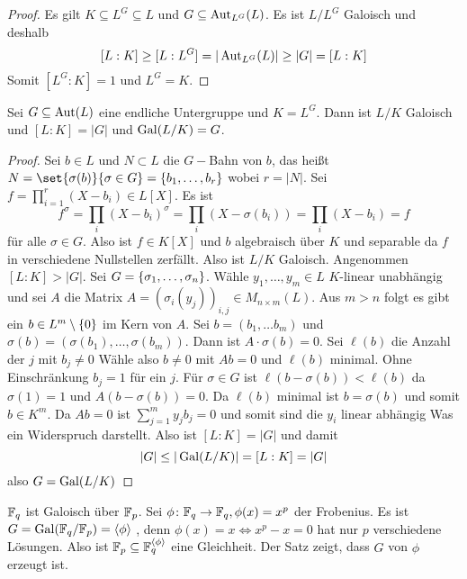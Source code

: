 \begin{proof}
    Es gilt \(K\subseteq L^G\subseteq L\) und \(G\subseteq\operatorname{Aut}_{L^G}(L)\). Es ist \(L/L^G\) Galoisch und deshalb
    \[[L:K]\geq [L:L^G]=|\operatorname{Aut}_{L^G}(L)|\geq |G|=[L:K]\]
    Somit \([L^G:K]=1\) und \(L^G=K\).
\end{proof}
\begin{Satz}\label{Satz:Galois2}
    Sei \(G\subseteq \operatorname{Aut}(L)\) eine endliche Untergruppe und \(K=L^G\). Dann ist \(L/K\) Galoisch und \([L:K]=|G|\) und \(\operatorname{Gal}(L/K)=G\).
\end{Satz}
\begin{proof}
    Sei \(b\in L\) und \(N\subset L\) die \(G-\)Bahn von \(b\), das heißt \(N=\set{\sigma(b)}{ \sigma\in G}=\{b_1,\dots,b_r\}\) wobei \(r=|N|\). Sei \(f=\prod_{i=1}^r(X-b_i)\in L[X]\).
    Es ist \[f^\sigma=\prod_i(X-b_i)^\sigma=\prod_i(X-\sigma(b_i))=\prod_i(X-b_i)=f\] für alle \(\sigma\in G.\) Also ist \(f\in K[X]\) und \(b\) algebraisch über \(K\) und separable da \(f\) in verschiedene Nullstellen zerfällt.
    Also ist \(L/K\) Galoisch.
    Angenommen \([L:K]>|G|\). Sei \(G=\{\sigma_1,\dots,\sigma_n\}\). Wähle \(y_1,\dots,y_m\in L\) \(K\)-linear unabhängig und sei \(A\) die Matrix \(A=(\sigma_i(y_j))_{i,j}\in M_{n\times m}(L)\).
    Aus \(m>n\) folgt es gibt ein \(b\in L^m\setminus\{0\}\) im Kern von \(A\).
    Sei \(b=(b_1,\dots b_m)\) und \(\sigma(b)=(\sigma(b_1),\dots,\sigma(b_m))\).
    Dann ist \(A\cdot \sigma(b)=0\).
    Sei \(\ell(b)\) die Anzahl der \(j\) mit \(b_j\neq 0\) Wähle also \(b\neq 0\) mit \(Ab=0\) und \(\ell(b)\) minimal. Ohne Einschränkung \(b_j=1\) für ein \(j\).
    Für \(\sigma\in G\) ist \(\ell(b-\sigma(b))<\ell(b)\) da \(\sigma(1)=1\) und \(A(b-\sigma(b))=0\). Da \(\ell(b)\) minimal ist \(b=\sigma(b)\) und somit \(b\in K^m\).
    Da \(Ab=0\) ist \(\sum_{j=1}^my_jb_j=0\) und somit sind die \(y_i\) linear abhängig Was ein Widerspruch darstellt.
    Also ist \([L:K]=|G|\) und damit 
    \[|G|\leq |\operatorname{Gal}(L/K)|=[L:K]=|G|\] also \(G=\operatorname{Gal}(L/K)\)
\end{proof}
\begin{Bsp}
    \(\mathbb{F}_q\) ist Galoisch über \(\mathbb{F}_p\). Sei \(\phi\colon \mathbb{F}_q\to \mathbb{F}_q, \phi(x)=x^p\) der Frobenius. Es ist \(G=\operatorname{Gal}(\mathbb{F}_q/\mathbb{F}_p)=\langle\phi\rangle\)
, denn \(\phi(x)=x\iff x^p-x=0\) hat nur \(p\) verschiedene Lösungen. Also ist \(\mathbb{F}_p\subseteq \mathbb{F}_q^{\langle\phi\rangle}\) eine Gleichheit. Der Satz zeigt, dass \(G\) von \(\phi\) erzeugt ist.
\end{Bsp}
